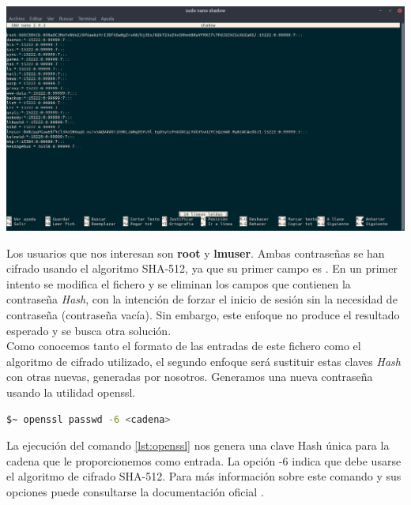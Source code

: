 \begin{center}
    \includegraphics[scale=0.25]{imagenes/shadow.png}
    \label{img:shadow}
\end{center}

Los usuarios que nos interesan son \textbf{root} y \textbf{lmuser}. Ambas contraseñas se han cifrado usando el algoritmo SHA-512, ya que su primer campo es \textdollar. En un primer intento se modifica el fichero y se eliminan los campos que contienen la contraseña \textit{Hash}, con la intención de forzar el inicio de sesión sin la necesidad de contraseña (contraseña vacía). Sin embargo, este enfoque no produce el resultado esperado y se busca otra solución. \\ Como conocemos tanto el formato de las entradas de este fichero como el algoritmo de cifrado utilizado, el segundo enfoque será sustituir estas claves \textit{Hash} con otras nuevas, generadas por nosotros. Generamos una nueva contraseña usando la utilidad \gls{openssl}.\newline

\begin{lstlisting}[language=bash, label={lst:openssl}, caption={Generación de Hash usando cifrado SHA-512}]
    $~ openssl passwd -6 <cadena>
\end{lstlisting}

La ejecución del comando \ref{lst:openssl} nos genera una clave Hash única para la cadena que le proporcionemos como entrada. La opción -6 indica que debe usarse el algoritmo de cifrado SHA-512. Para más información sobre este comando y sus opciones puede consultarse la documentación oficial \cite{openssl}.

